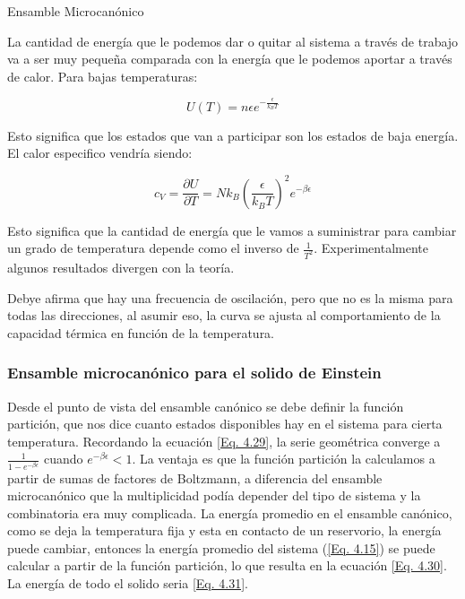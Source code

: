 \documentclass[11pt,fleqn]{book}
\begin{document}
\begin{remark}{Ensamble Microcanónico}

La cantidad de energía que le podemos dar o quitar al sistema a través de trabajo va a ser muy pequeña comparada con la energía que le podemos aportar a través de calor. Para bajas temperaturas:

\begin{equation*}
    U(T)=n\epsilon e^{-\frac{\epsilon}{k_{B}T}}
\end{equation*}

Esto significa que los estados que van a participar son los estados de baja energía. El calor especifico vendría siendo:

\begin{equation*}
    c_{V}=\frac{\partial U}{\partial T}=Nk_{B}\left(\frac{\epsilon}{k_{B}T}\right)^{2}e^{-\beta\epsilon}
\end{equation*}

Esto significa que la cantidad de energía que le vamos a suministrar para cambiar un grado de temperatura depende como el inverso de $\frac{1}{T^{2}}$. Experimentalmente algunos resultados divergen con la teoría.


Debye afirma que hay una frecuencia de oscilación, pero que no es la misma para todas las direcciones, al asumir eso, la curva se ajusta al comportamiento de la capacidad térmica en función de la temperatura. 
\end{remark}   

\subsubsection{Ensamble microcanónico para el solido de Einstein}

Desde el punto de vista del ensamble canónico se debe definir la función partición, que nos dice cuanto estados disponibles hay en el sistema para cierta temperatura. Recordando la ecuación \ref{Eq. 4.29}, la serie geométrica converge a $\frac{1}{1-e^{-\beta\epsilon}}$ cuando $e^{-\beta\epsilon}<1$.  La ventaja es que la función partición la calculamos a partir de sumas de factores de Boltzmann, a diferencia del ensamble microcanónico que la multiplicidad podía depender del tipo de sistema y la combinatoria era muy complicada. La energía promedio en el ensamble canónico, como se deja la temperatura fija y esta en contacto de un reservorio, la energía puede cambiar, entonces la energía promedio del sistema (\ref{Eq. 4.15}) se puede calcular a partir de la función partición, lo que resulta en la ecuación \ref{Eq. 4.30}. La energía de todo el solido seria \ref{Eq. 4.31}.
\end{document}
